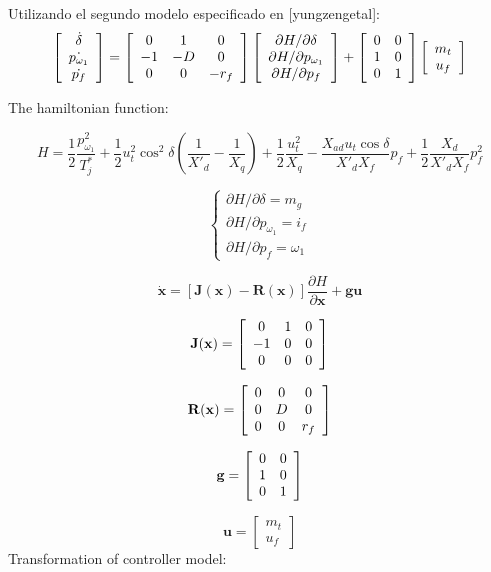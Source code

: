 Utilizando el segundo modelo especificado en [yungzengetal]:
\[
\left[
\begin{array}{c}
\dot{\delta}\\
\dot{p_{\omega_1}}\\
\dot{p_f}
\end{array}
\right]
=
\left[
\begin{array}{c c c}
0&1&0\\
-1&-D&0\\
0&0&-r_f
\end{array}
\right]
\left[
\begin{array}{c}
\partial H/\partial\delta\\
\partial H/\partial p_{\omega_1}\\
\partial H/\partial p_f
\end{array}
\right]
+
\left[
\begin{array}{c c}
0&0\\
1&0\\
0&1
\end{array}
\right]
\left[
\begin{array}{c}
m_t\\
u_f
\end{array}
\right]
\]

The hamiltonian function:

\[
H=\frac{1}{2}\frac{p_{\omega_1}^2}{T_j^*}+
\frac{1}{2}u_t^2 \cos^2{\delta}(\frac{1}{X'_d}-\frac{1}{X_q})+
\frac{1}{2}\frac{u_t^2}{X_q}-
\frac{X_{ad}u_t\cos{\delta}}{X'_dX_f}p_f+
\frac{1}{2}\frac{X_d}{X'_dX_f}p_f^2

\]

\[
\left\{
\begin{array}{c}
\partial H/\partial\delta=m_g\\
\partial H/\partial p_{\omega_1}=i_f\\
\partial H/\partial p_f=\omega_1
\end{array}

\]

\[
\mathbf{\dot{x}}=[\mathbf{J(x)}-\mathbf{R(x)}]\frac{\partial H}{\partial \mathbf{{x}}}+\mathbf{gu}
\]

\[
\mathbf{J(x)}=
\left[
\begin{array}{c c c}
0&1&0\\
-1&0&0\\
0&0&0
\end{array}
\right]
\]

\[
\mathbf{R(x)}=
\left[
\begin{array}{c c c}
0&0&0\\
0&D&0\\
0&0&r_f
\end{array}
\right]
\]

\[
\mathbf{g}=
\left[
\begin{array}{c c}
0&0\\
1&0\\
0&1
\end{array}
\right]
\]

\[
\mathbf{u}=
\left[
\begin{array}{c}
m_t\\
u_f
\end{array}
\right]
\]
Transformation of controller model:





